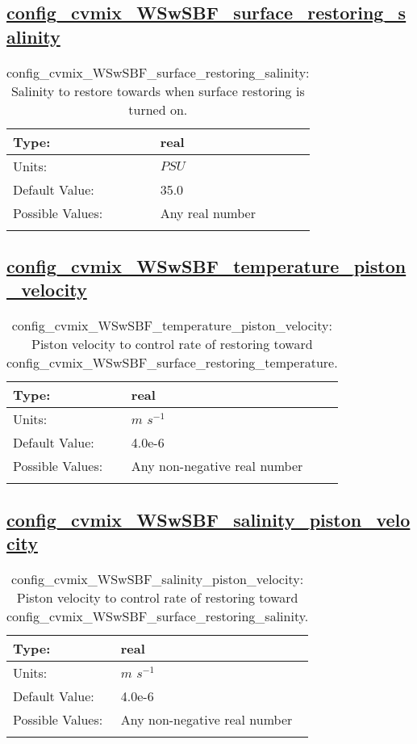 \subsection[config\_cvmix\_WSwSBF\_surface\_restoring\_salinity]{\hyperref[sec:nm_tab_cvmix_WSwSBF]{config\_cvmix\_WSwSBF\_surface\_restoring\_salinity}}
\label{subsec:nm_sec_config_cvmix_WSwSBF_surface_restoring_salinity}
\begin{center}
\begin{longtable}{| p{2.0in} || p{4.0in} |}
    \hline
    Type: & real \\
    \hline
    Units: & $PSU$ \\
    \hline
    Default Value: & 35.0 \\
    \hline
    Possible Values: & Any real number \\
    \hline
    \caption{config\_cvmix\_WSwSBF\_surface\_restoring\_salinity: Salinity to restore towards when surface restoring is turned on.}
\end{longtable}
\end{center}
\subsection[config\_cvmix\_WSwSBF\_temperature\_piston\_velocity]{\hyperref[sec:nm_tab_cvmix_WSwSBF]{config\_cvmix\_WSwSBF\_temperature\_piston\_velocity}}
\label{subsec:nm_sec_config_cvmix_WSwSBF_temperature_piston_velocity}
\begin{center}
\begin{longtable}{| p{2.0in} || p{4.0in} |}
    \hline
    Type: & real \\
    \hline
    Units: & $m$ $s^{-1}$ \\
    \hline
    Default Value: & 4.0e-6 \\
    \hline
    Possible Values: & Any non-negative real number \\
    \hline
    \caption{config\_cvmix\_WSwSBF\_temperature\_piston\_velocity: Piston velocity to control rate of restoring toward config\_cvmix\_WSwSBF\_surface\_restoring\_temperature.}
\end{longtable}
\end{center}
\subsection[config\_cvmix\_WSwSBF\_salinity\_piston\_velocity]{\hyperref[sec:nm_tab_cvmix_WSwSBF]{config\_cvmix\_WSwSBF\_salinity\_piston\_velocity}}
\label{subsec:nm_sec_config_cvmix_WSwSBF_salinity_piston_velocity}
\begin{center}
\begin{longtable}{| p{2.0in} || p{4.0in} |}
    \hline
    Type: & real \\
    \hline
    Units: & $m$ $s^{-1}$ \\
    \hline
    Default Value: & 4.0e-6 \\
    \hline
    Possible Values: & Any non-negative real number \\
    \hline
    \caption{config\_cvmix\_WSwSBF\_salinity\_piston\_velocity: Piston velocity to control rate of restoring toward config\_cvmix\_WSwSBF\_surface\_restoring\_salinity.}
\end{longtable}
\end{center}
